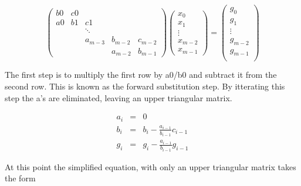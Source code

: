 \documentclass{article}
\begin{document}
\begin{equation}
\label{eqn: mat system}
\left( \begin{array}{ccccc}
	 b0 & c0 &        &         &         \\
	a0 &  b1 &  c1    &         &         \\
	   &    & \ddots  &         &         \\
	   &	    & a_{m-3} & b_{m-2} & c_{m-2} \\
	   &    &         & a_{m-2} & b_{m-1}
   \end{array} \right)
\left( \begin{array}{c}
	x_0     \\
	x_1     \\
	\vdots  \\
	x_{m-2} \\
	x_{m-1}
   \end{array} \right)
=
\left( \begin{array}{c}
	g_0     \\
	g_1     \\
	\vdots  \\
	g_{m-2} \\
	g_{m-1} \\
   \end{array} \right)
\end{equation}

The first step is to multiply the first row by a0/b0 and subtract it from the second row.  This is known as the forward substitution step.  By itterating this step the a's are eliminated, leaving an upper triangular matrix.

\begin{equation}
\begin{aligned}
	a_i &=& 0                                    \\
	b_i &=& b_i - \frac{a_{i-1}}{b_{i-1}}c_{i-1} \\
	g_i &=& g_i - \frac{a_{i-1}}{b_{i-1}}g_{i-1}
\end{aligned}
\end{equation}

At this point the simplified equation, with only an upper triangular matrix takes the form
\end{document}
